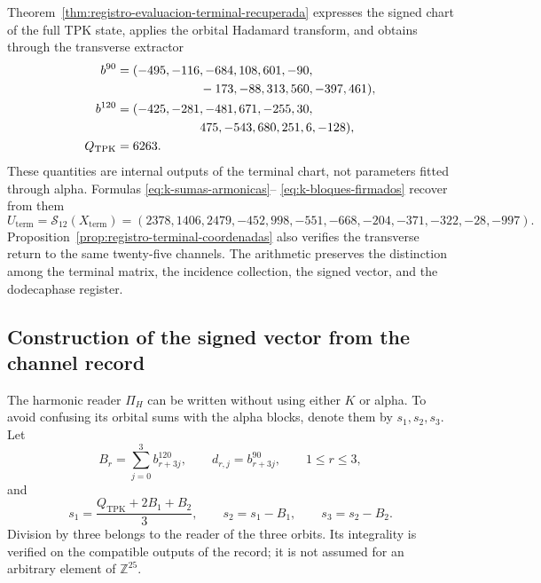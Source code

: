 

Theorem~\ref{thm:registro-evaluacion-terminal-recuperada} expresses the
signed chart of the full TPK state, applies the orbital Hadamard transform,
and obtains through the transverse extractor
\begin{align*}
 b^{90}={}&(-495,-116,-684,108,601,-90,\\
            &\hspace{19mm}-173,-88,313,560,-397,461),\\
 b^{120}={}&(-425,-281,-481,671,-255,30,\\
             &\hspace{19mm}475,-543,680,251,6,-128),\\
 Q_{\mathrm{TPK}}={}&6263.
\end{align*}
These quantities are internal outputs of the terminal chart, not parameters
fitted through alpha. Formulas \eqref{eq:k-sumas-armonicas}--
\eqref{eq:k-bloques-firmados} recover from them
\begin{equation}
 U_{\mathrm{term}}
 =\mathcal S_{12}(X_{\mathrm{term}})
 =(2378,1406,2479,-452,998,-551,
   -668,-204,-371,-322,-28,-997).
 \label{eq:k-u-terminal-directo}
\end{equation}
Proposition~\ref{prop:registro-terminal-coordenadas} also verifies the
transverse return to the same twenty-five channels. The arithmetic preserves
the distinction among the terminal matrix, the incidence collection, the signed
vector, and the dodecaphase register.

\subsection{Construction of the signed vector from the channel record}
\label{subsec:k-pi-h}

The harmonic reader \(\Pi_H\) can be written without using either \(K\) or
alpha. To avoid confusing its orbital sums with the alpha blocks, denote them
by \(s_1,s_2,s_3\). Let
\[
 B_r=\sum_{j=0}^{3}b^{120}_{r+3j},\qquad
 d_{r,j}=b^{90}_{r+3j},\qquad1\leq r\leq3,
\]
and
\begin{equation}
 s_1=\frac{Q_{\mathrm{TPK}}+2B_1+B_2}{3},\qquad
 s_2=s_1-B_1,\qquad s_3=s_2-B_2.
 \label{eq:k-sumas-armonicas}
\end{equation}
Division by three belongs to the reader of the three orbits. Its integrality
is verified on the compatible outputs of the record; it is not assumed for an
arbitrary element of \(\mathbb Z^{25}\).

